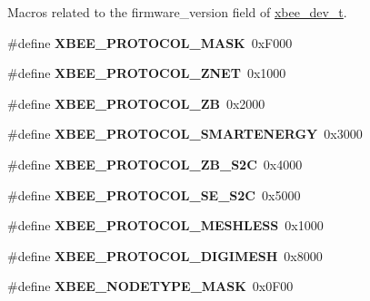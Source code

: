 Macros related to the {\ttfamily firmware\+\_\+version} field of \hyperlink{structxbee__dev__t}{xbee\+\_\+dev\+\_\+t}. \begin{DoxyCompactItemize}
\item 
\mbox{\label{group__xbee__device_gacf47336da3a62c0f6c035ae5ef694f6a}} 
\#define {\bfseries X\+B\+E\+E\+\_\+\+P\+R\+O\+T\+O\+C\+O\+L\+\_\+\+M\+A\+SK}~0x\+F000
\item 
\mbox{\label{group__xbee__device_gaba2301cd1c684d8297b252ccf0a56e48}} 
\#define {\bfseries X\+B\+E\+E\+\_\+\+P\+R\+O\+T\+O\+C\+O\+L\+\_\+\+Z\+N\+ET}~0x1000
\item 
\mbox{\label{group__xbee__device_ga6da8b301ac3fe5a6325c7fa9862aa42f}} 
\#define {\bfseries X\+B\+E\+E\+\_\+\+P\+R\+O\+T\+O\+C\+O\+L\+\_\+\+ZB}~0x2000
\item 
\mbox{\label{group__xbee__device_ga90c85cf78fb81cf3a82106f0723a0130}} 
\#define {\bfseries X\+B\+E\+E\+\_\+\+P\+R\+O\+T\+O\+C\+O\+L\+\_\+\+S\+M\+A\+R\+T\+E\+N\+E\+R\+GY}~0x3000
\item 
\mbox{\label{group__xbee__device_ga0ebb580d372ba39e2cf878b163cd2a53}} 
\#define {\bfseries X\+B\+E\+E\+\_\+\+P\+R\+O\+T\+O\+C\+O\+L\+\_\+\+Z\+B\+\_\+\+S2C}~0x4000
\item 
\mbox{\label{group__xbee__device_gad111f22d8c5e8c8b9e62e791f49098c3}} 
\#define {\bfseries X\+B\+E\+E\+\_\+\+P\+R\+O\+T\+O\+C\+O\+L\+\_\+\+S\+E\+\_\+\+S2C}~0x5000
\item 
\mbox{\label{group__xbee__device_gabc8f957da9c61e7dd5385a013c4bace2}} 
\#define {\bfseries X\+B\+E\+E\+\_\+\+P\+R\+O\+T\+O\+C\+O\+L\+\_\+\+M\+E\+S\+H\+L\+E\+SS}~0x1000
\item 
\mbox{\label{group__xbee__device_ga640e6dc87a7153317adc2bc1b758109f}} 
\#define {\bfseries X\+B\+E\+E\+\_\+\+P\+R\+O\+T\+O\+C\+O\+L\+\_\+\+D\+I\+G\+I\+M\+E\+SH}~0x8000
\item 
\mbox{\label{group__xbee__device_gaa3f98fbceafbcefe7339af9998f171fb}} 
\#define {\bfseries X\+B\+E\+E\+\_\+\+N\+O\+D\+E\+T\+Y\+P\+E\+\_\+\+M\+A\+SK}~0x0\+F00

\end{DoxyCompactItemize}
